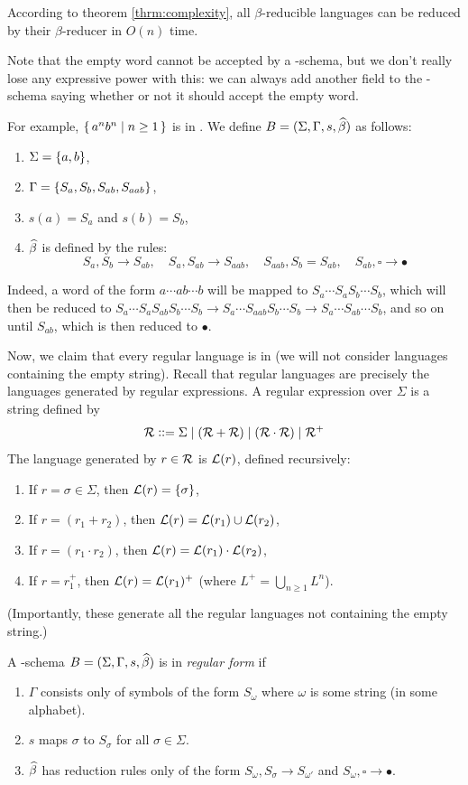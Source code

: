 \documentclass{llncs}
\begin{document}
According to theorem \ref{thrm:complexity}, all $\beta$-reducible languages can be reduced by their $\beta$-reducer in $O(n)$ time.

Note that the empty word cannot be accepted by a \BR-schema, but we don't really lose any expressive power with this: we can always add another field to the \BR-schema saying whether or not it should accept the empty word.

For example, $\set{a^nb^n}[n\geq1]$ is in \BR.
We define $B=(\Sigma,\Gamma,s,\widehat\beta)$ as follows:
\begin{enumerate}
    \item $\Sigma=\set{a,b}$,
    \item $\Gamma=\set{S_a,S_b,S_{ab},S_{aab}}$,
    \item $s(a)=S_a$ and $s(b)=S_b$,
    \item $\widehat\beta$ is defined by the rules:
        \[ S_a,S_b\to S_{ab},\quad S_a,S_{ab}\to S_{aab},\quad S_{aab},S_b=S_{ab},\quad S_{ab},\square\to\bullet \]
\end{enumerate}
Indeed, a word of the form $a\cdots ab\cdots b$ will be mapped to $S_a\cdots S_aS_b\cdots S_b$, which will then be reduced to $S_a\cdots S_aS_{ab}S_b\cdots S_b\to S_a\cdots S_{aab}S_b\cdots S_b\to S_a\cdots S_{ab}\cdots S_b$, and so on until $S_{ab}$, which is then reduced
to $\bullet$.

Now, we claim that every regular language is in \BR{} (we will not consider languages containing the empty string).
Recall that regular languages are precisely the languages generated by regular expressions.
A regular expression over $\Sigma$ is a string defined by
\[ \mathcal{R} \mathrel{{\mathop:}{\mathop:}{=}} \Sigma \mid (\mathcal{R}+\mathcal{R}) \mid (\mathcal{R}\cdot\mathcal{R}) \mid \mathcal{R}^+ \]
The language generated by $r\in\mathcal{R}$ is $\mathcal{L}(r)$, defined recursively:
\begin{enumerate}
    \item If $r=\sigma\in\Sigma$, then $\c L(r)=\set\sigma$,
    \item If $r=(r_1+r_2)$, then $\mathcal{L}(r)=\mathcal{L}(r_1)\cup\mathcal{L}(r_2)$,
    \item If $r=(r_1\cdot r_2)$, then $\mathcal{L}(r)=\mathcal{L}(r_1)\cdot\mathcal{L}(r_2)$,
    \item If $r=r_1^+$, then $\mathcal{L}(r)=\mathcal{L}(r_1)^+$ (where $L^+=\bigcup_{n\geq1}L^n$).
\end{enumerate}
(Importantly, these generate all the regular languages not containing the empty string.)

\begin{definition}

    A \BR-schema $B=(\Sigma,\Gamma,s,\widehat\beta)$ is in \emph{regular form} if
    \begin{enumerate}
        \item $\Gamma$ consists only of symbols of the form $S_\omega$ where $\omega$ is some string (in some alphabet).
        \item $s$ maps $\sigma$ to $S_\sigma$ for all $\sigma\in\Sigma$.
        \item $\widehat\beta$ has reduction rules only of the form $S_\omega,S_\sigma\to S_{\omega'}$ and $S_\omega,\square\to\bullet$.
    \end{enumerate}

\end{definition}
\end{document}

